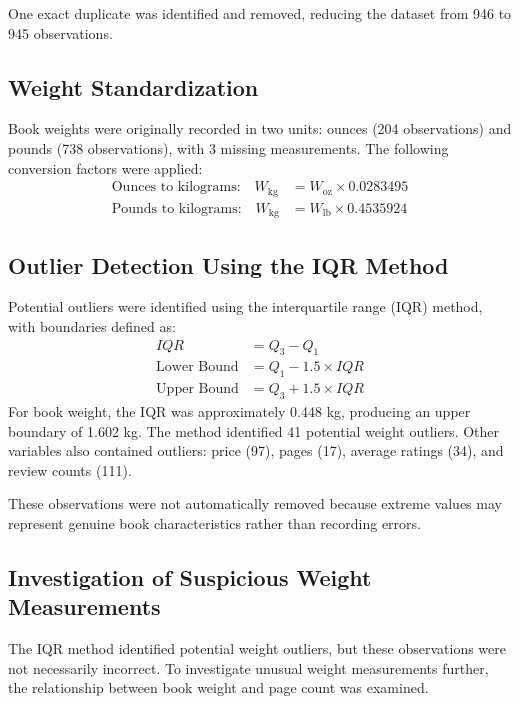 \documentclass[11pt,a4paper]{article}
\begin{document}
One exact duplicate was identified and removed,
reducing the dataset from 946 to 945 observations.



\subsection{Weight Standardization}

Book weights were originally recorded in two units:
ounces (204 observations) and pounds (738 observations),
with 3 missing measurements. 
The following conversion factors were applied:
\begin{align*}
\text{Ounces to kilograms:}\quad
W_{\mathrm{kg}} &= W_{\mathrm{oz}} \times 0.0283495 \\[8pt]
\text{Pounds to kilograms:}\quad
W_{\mathrm{kg}} &= W_{\mathrm{lb}} \times 0.4535924
\end{align*}

\subsection{Outlier Detection Using the IQR Method}

Potential outliers were identified using the interquartile
range (IQR) method, with boundaries defined as:
\begin{align*}
IQR &= Q_3 - Q_1 \\[6pt]
\text{Lower Bound} &= Q_1 - 1.5 \times IQR \\[6pt]
\text{Upper Bound} &= Q_3 + 1.5 \times IQR
\end{align*}
For book weight, the IQR was approximately 0.448 kg, producing an upper boundary of 1.602 kg. The method identified 41 potential weight outliers. Other variables also contained outliers: price (97), pages (17), average ratings (34), and review counts (111).

These observations were not automatically removed because extreme values may represent genuine book characteristics rather than recording errors.
\newpage
\subsection{Investigation of Suspicious Weight Measurements}
The IQR method identified potential weight outliers, but
these observations were not necessarily incorrect. To investigate unusual weight measurements further, the relationship between book weight and page count was examined.
\end{document}
